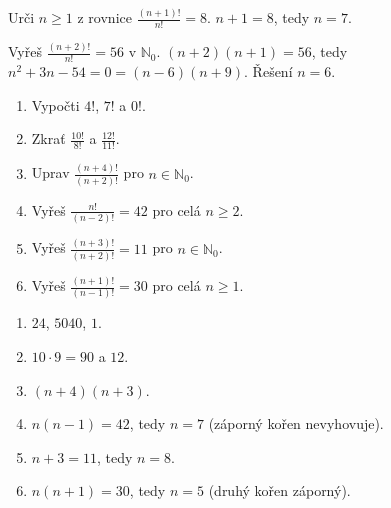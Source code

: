 \documentclass[11pt,a4paper]{article}
\begin{document}
\begin{zadaniReseniBox}[title={Samostatná práce 3}]
Urči $n\ge1$ z rovnice $\frac{(n+1)!}{n!}=8$.
\tcblower
$n+1=8$, tedy $n=7$.
\end{zadaniReseniBox}




\begin{zadaniReseniBox}[title={Rozšíření 1}]
Vyřeš $\frac{(n+2)!}{n!}=56$ v $\mathbb N_0$.
\tcblower
$(n+2)(n+1)=56$, tedy $n^2+3n-54=0=(n-6)(n+9)$. Řešení $n=6$.
\end{zadaniReseniBox}





\begin{zadaniReseniBox}[title={Domácí úkol}]

\begin{enumerate}[label=\alph*),leftmargin=*,itemsep=2pt]

\item Vypočti $4!$, $7!$ a $0!$.
\item Zkrať $\frac{10!}{8!}$ a $\frac{12!}{11!}$.
\item Uprav $\frac{(n+4)!}{(n+2)!}$ pro $n\in\mathbb N_0$.
\item Vyřeš $\frac{n!}{(n-2)!}=42$ pro celá $n\ge2$.
\item Vyřeš $\frac{(n+3)!}{(n+2)!}=11$ pro $n\in\mathbb N_0$.
\item Vyřeš $\frac{(n+1)!}{(n-1)!}=30$ pro celá $n\ge1$.

\end{enumerate}

\tcblower

\begin{enumerate}[label=\alph*),leftmargin=*,itemsep=2pt]

\item $24$, $5040$, $1$.
\item $10\cdot9=90$ a $12$.
\item $(n+4)(n+3)$.
\item $n(n-1)=42$, tedy $n=7$ (záporný kořen nevyhovuje).
\item $n+3=11$, tedy $n=8$.
\item $n(n+1)=30$, tedy $n=5$ (druhý kořen záporný).

\end{enumerate}

\end{zadaniReseniBox}

\end{document}
